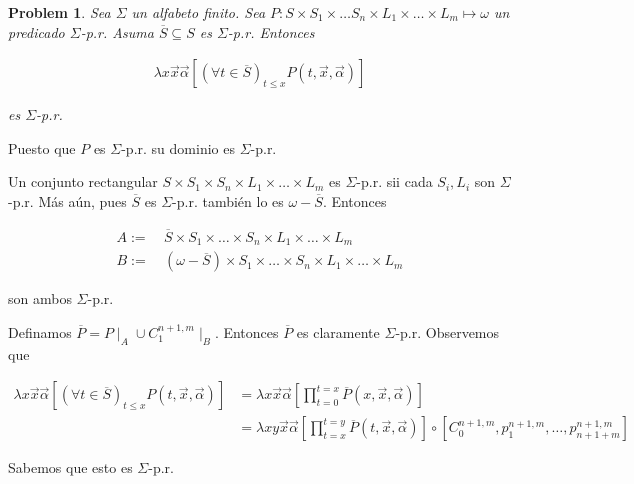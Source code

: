 \documentclass[a4paper, 12pt]{article}
\newtheorem{problem}{Problem}
\newtheorem{problem}{Problem}
\begin{document}
\pagebreak 

\begin{problem}
    Sea $\Sigma$ un alfabeto finito. Sea $P : S \times S_1 \times \ldots S_n
    \times L_1 \times \ldots \times L_m \mapsto \omega$  un predicado
    $\Sigma$-p.r. Asuma $\overline{S} \subseteq S$ es $\Sigma$-p.r. Entonces 

    \begin{align*}
        \lambda x \vec{x}\vec{\alpha} \left[ (\forall t \in \overline{S})_{t
        \leq x} P(t, \vec{x}, \vec{\alpha})  \right]
    \end{align*}

    es $\Sigma$-p.r. 
\end{problem}

Puesto que $P$ es $\Sigma$-p.r. su dominio es $\Sigma$-p.r. 

Un conjunto rectangular $S \times S_1 \times S_n \times L_1 \times  \ldots \times  L_m$ es $\Sigma$-p.r. sii
cada $S_i, L_i$ son $\Sigma$-p.r. 
Más aún, pues $\overline{S}$ es $\Sigma$-p.r. también lo es
$\omega - \overline{S}$. Entonces 

\begin{align*}
    A :=~ &\overline{S} \times S_1 \times  \ldots \times S_n \times L_1 \times
    \ldots\times  L_m \\ 
    B :=~ &( \omega - \overline{S} ) \times  S_1 \times  \ldots \times S_n \times L_1
    \times  \ldots \times L_m
\end{align*}

son ambos $\Sigma$-p.r. 

Definamos $\overline{P} = P \mid_{A} \cup C_1^{n+1, m} \mid_{B}$. Entonces
$\overline{P}$ es claramente $\Sigma$-p.r. Observemos que 

\begin{align*}
    \lambda x \vec{x}\vec{\alpha} \left[ (\forall t \in \overline{S})_{t \leq x}
    P(t, \vec{x}, \vec{\alpha})\right] &= \lambda x \vec{x}\vec{\alpha} \left[
\prod_{t=0}^{t = x} \overline{P}(x, \vec{x}, \vec{\alpha})  \right] \\ 
                                       &= \lambda xy\vec{x}\vec{\alpha} \left[
                                       \prod_{t=x}^{t=y} \overline{P}(t,
                                   \vec{x}, \vec{\alpha})  \right]  \circ \left[
                               C_0^{n+1, m}, p_1^{n+1, m},  \ldots,
                           p_{n+1+m}^{n+1, m}\right] 
\end{align*}

Sabemos que esto es $\Sigma$-p.r. 
\end{document}
